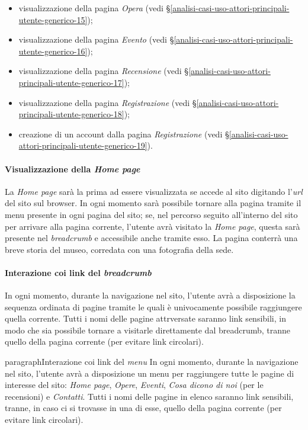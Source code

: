 \begin{itemize}
	\item visualizzazione della pagina \textit{Opera} (vedi §\ref{analisi-casi-uso-attori-principali-utente-generico-15});
	\item visualizzazione della pagina \textit{Evento} (vedi §\ref{analisi-casi-uso-attori-principali-utente-generico-16});
	\item visualizzazione della pagina \textit{Recensione} (vedi §\ref{analisi-casi-uso-attori-principali-utente-generico-17});
	\item visualizzazione della pagina \textit{Registrazione} (vedi §\ref{analisi-casi-uso-attori-principali-utente-generico-18});
	\item creazione di un account dalla pagina \textit{Registrazione} (vedi §\ref{analisi-casi-uso-attori-principali-utente-generico-19}).
\end{itemize}

\paragraph{Visualizzazione della \textit{Home page}}
\label{analisi-casi-uso-attori-principali-utente-generico-1}
La \textit{Home page} sarà la prima ad essere visualizzata se accede al sito digitando l'\textit{url} del sito sul browser. In ogni momento sarà possibile tornare alla pagina tramite il menu presente in ogni pagina del sito; se, nel percorso seguito all'interno del sito per arrivare alla pagina corrente, l'utente avrà visitato la \textit{Home page}, questa sarà presente nel \textit{breadcrumb} e accessibile anche tramite esso. La pagina conterrà una breve storia del museo, corredata con una fotografia della sede.

\paragraph{Interazione coi link del \textit{breadcrumb}}
\label{analisi-casi-uso-attori-principali-utente-generico-2}
In ogni momento, durante la navigazione nel sito, l'utente avrà a disposizione la sequenza ordinata di pagine tramite le quali è univocamente possibile raggiungere quella corrente. Tutti i nomi delle pagine attrversate saranno link sensibili, in modo che sia possibile tornare a visitarle direttamente dal breadcrumb, tranne quello della pagina corrente (per evitare link circolari).

paragraph{Interazione coi link del \textit{menu}}
\label{analisi-casi-uso-attori-principali-utente-generico-3}
In ogni momento, durante la navigazione nel sito, l'utente avrà a disposizione un menu per raggiungere tutte le pagine di interesse del sito: \textit{Home page}, \textit{Opere}, \textit{Eventi}, \textit{Cosa dicono di noi} (per le recensioni) e \textit{Contatti}. Tutti i nomi delle pagine in elenco saranno link sensibili, tranne, in caso ci si trovasse in una di esse, quello della pagina corrente (per evitare link circolari).

